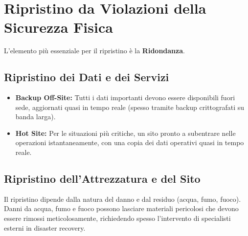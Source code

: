 \section{Ripristino da Violazioni della Sicurezza Fisica}

L'elemento più essenziale per il ripristino è la \textbf{Ridondanza}.

\subsection{Ripristino dei Dati e dei Servizi}
\begin{itemize}
    \item \textbf{Backup Off-Site:} Tutti i dati importanti devono essere disponibili fuori sede, aggiornati quasi in tempo reale (spesso tramite backup crittografati su banda larga).
    \item \textbf{Hot Site:} Per le situazioni più critiche, un sito pronto a subentrare nelle operazioni istantaneamente, con una copia dei dati operativi quasi in tempo reale.
\end{itemize}

\subsection{Ripristino dell'Attrezzatura e del Sito}
Il ripristino dipende dalla natura del danno e dal residuo (acqua, fumo, fuoco). Danni da acqua, fumo e fuoco possono lasciare materiali pericolosi che devono essere rimossi meticolosamente, richiedendo spesso l'intervento di specialisti esterni in disaster recovery.